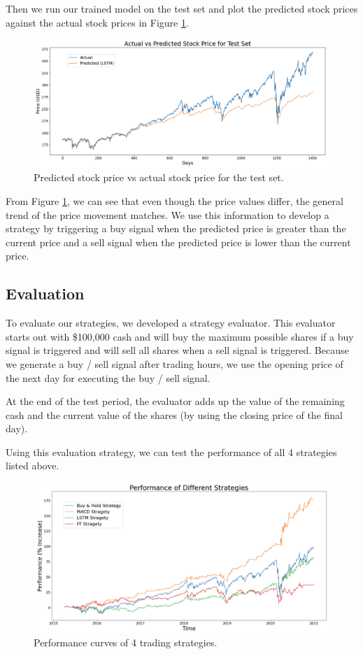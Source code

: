 \documentclass[10pt]{article}
\begin{document}
Then we run our trained model on the test set and plot the predicted stock prices against the actual stock prices in Figure \ref{lstmtest}.

\begin{figure}[H]
\centering
\includegraphics[width=\textwidth]{lstm-test}
\caption{Predicted stock price vs actual stock price for the test set.}
\label{lstmtest}
\end{figure}

From Figure \ref{lstmtest}, we can see that even though the price values differ, the general trend of the price movement matches. We use this information to develop a strategy by triggering a buy signal when the predicted price is greater than the current price and a sell signal when the predicted price is lower than the current price.


\subsection{Evaluation}

To evaluate our strategies, we developed a strategy evaluator. This evaluator starts out with \$100,000 cash and will buy the maximum possible shares if a buy signal is triggered and will sell all shares when a sell signal is triggered. Because we generate a buy / sell signal after trading hours, we use the opening price of the next day for executing the buy / sell signal.

At the end of the test period, the evaluator adds up the value of the remaining cash and the current value of the shares (by using the closing price of the final day).

Using this evaluation strategy, we can test the performance of all 4 strategies listed above.

\begin{figure}[H]
\centering
\includegraphics[width=\textwidth]{perf}
\caption{Performance curves of 4 trading strategies.}
\label{perf}
\end{figure}
\end{document}
